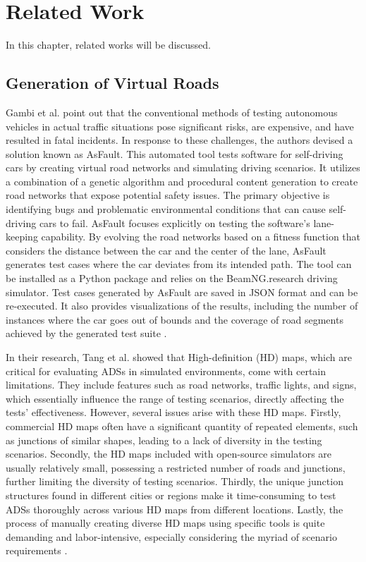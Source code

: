 \chapter{Related Work}
In this chapter, related works will be discussed.

\section{Generation of Virtual Roads}
Gambi et al. point out that the conventional methods of testing autonomous vehicles in actual traffic situations pose significant risks, are expensive, and have resulted in fatal incidents. In response to these challenges, the authors devised a solution known as AsFault. This automated tool tests software for self-driving cars by creating virtual road networks and simulating driving scenarios. It utilizes a combination of a genetic algorithm and procedural content generation to create road networks that expose potential safety issues. The primary objective is identifying bugs and problematic environmental conditions that can cause self-driving cars to fail. AsFault focuses explicitly on testing the software's lane-keeping capability. By evolving the road networks based on a fitness function that considers the distance between the car and the center of the lane, AsFault generates test cases where the car deviates from its intended path. The tool can be installed as a Python package and relies on the BeamNG.research driving simulator. Test cases generated by AsFault are saved in JSON format and can be re-executed. It also provides visualizations of the results, including the number of instances where the car goes out of bounds and the coverage of road segments achieved by the generated test suite \cite{GambiMF}.

In their research, Tang et al. showed that High-definition (HD) maps, which are critical for evaluating ADSs in simulated environments, come with certain limitations. They include features such as road networks, traffic lights, and signs, which essentially influence the range of testing scenarios, directly affecting the tests' effectiveness. However, several issues arise with these HD maps. Firstly, commercial HD maps often have a significant quantity of repeated elements, such as junctions of similar shapes, leading to a lack of diversity in the testing scenarios. Secondly, the HD maps included with open-source simulators are usually relatively small, possessing a restricted number of roads and junctions, further limiting the diversity of testing scenarios. Thirdly, the unique junction structures found in different cities or regions make it time-consuming to test ADSs thoroughly across various HD maps from different locations. Lastly, the process of manually creating diverse HD maps using specific tools is quite demanding and labor-intensive, especially considering the myriad of scenario requirements \cite{TangZYZRLZC}.

